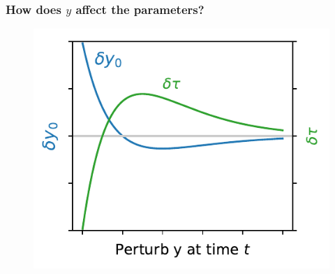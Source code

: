 \documentclass[xcolor={dvipsnames}]{beamer}
\begin{document}
\begin{frame}
\frametitle{How does $y$ affect the parameters?}
\begin{figure}
\includegraphics[width=0.95\textheight]{figs/perturb-y.pdf}
\end{figure}
\end{frame}
\end{document}
